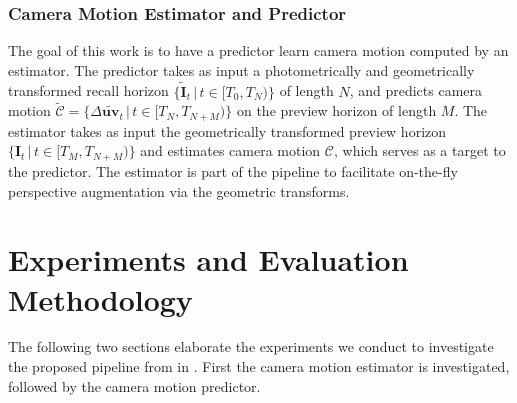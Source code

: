 \subsubsection{Camera Motion Estimator and Predictor}
\label{c3:sec:camera_motion_estimator_and_predictor}
The goal of this work is to have a predictor learn camera motion computed by an estimator.
The predictor takes as input a photometrically and geometrically transformed recall horizon $\{\tilde{\mathbf{I}}_t\,|\,t\in[T_0, T_N)\}$ of length $N$, and predicts camera motion $\tilde{\mathcal{C}} = \{\Delta \tilde{\mathbf{uv}}_t\,|\,t\in[T_N,T_{N+M})\}$ on the preview horizon of length $M$. The estimator takes as input the geometrically transformed preview horizon $\{\mathbf{I}_t\,|\,t\in[T_M, T_{N+M})\}$ and estimates camera motion $\mathcal{C}$, which serves as a target to the predictor. The estimator is part of the pipeline to facilitate on-the-fly perspective augmentation via the geometric transforms.




\section{Experiments and Evaluation Methodology}
The following two sections elaborate the experiments we conduct to investigate the proposed pipeline from  in . First the camera motion estimator is investigated, followed by the camera motion predictor.

